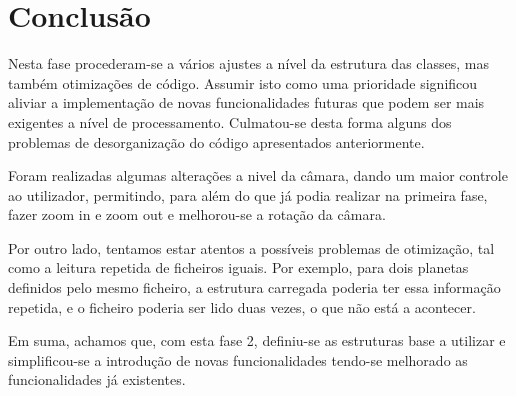 \chapter{Conclusão}

Nesta fase procederam-se a vários ajustes a nível da estrutura das classes, mas também otimizações de código. Assumir isto como uma prioridade significou aliviar a implementação de novas funcionalidades futuras que podem ser mais exigentes a nível de processamento. Culmatou-se desta forma alguns dos problemas de desorganização do código apresentados anteriormente.

Foram realizadas algumas alterações a nivel da câmara, dando um maior controle ao utilizador, permitindo, para além do que já podia realizar na primeira fase, fazer zoom in e zoom out e melhorou-se a rotação da câmara. 

Por outro lado, tentamos estar atentos a possíveis  problemas de otimização, tal como a leitura repetida de ficheiros iguais. Por exemplo, para dois planetas definidos pelo mesmo ficheiro, a estrutura carregada poderia ter essa informação repetida, e o ficheiro poderia ser lido duas vezes, o que não está a acontecer. 

Em suma, achamos que, com esta fase 2, definiu-se as estruturas base a utilizar e simplificou-se a introdução de novas funcionalidades tendo-se melhorado as funcionalidades já existentes.


